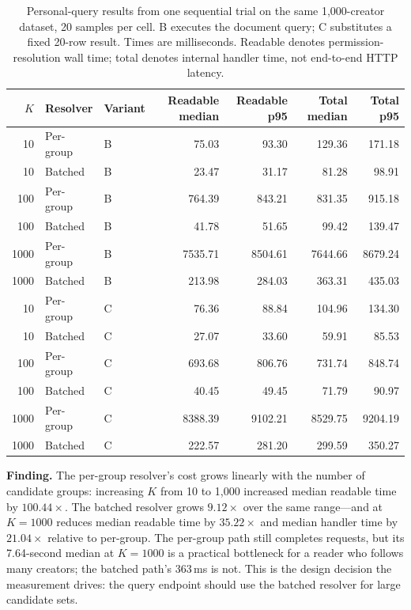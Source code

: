 \documentclass[sigconf, nonacm]{acmart}
\begin{document}
\begin{table}[t]
\centering
\small
\caption{Personal-query results from one sequential trial on the same
1,000-creator dataset, 20 samples per cell. B executes the document query; C
substitutes a fixed 20-row result. Times are milliseconds. Readable denotes
permission-resolution wall time; total denotes internal handler time, not
end-to-end HTTP latency.}
\label{tab:fanout}
\begin{tabular}{@{}rllrrrr@{}}
\toprule
$K$ & Resolver & Variant & Readable median & Readable p95 & Total median & Total p95 \\
\midrule
10 & Per-group & B & 75.03 & 93.30 & 129.36 & 171.18 \\
10 & Batched   & B & 23.47 & 31.17 & 81.28 & 98.91 \\
100 & Per-group & B & 764.39 & 843.21 & 831.35 & 915.18 \\
100 & Batched   & B & 41.78 & 51.65 & 99.42 & 139.47 \\
1000 & Per-group & B & 7535.71 & 8504.61 & 7644.66 & 8679.24 \\
1000 & Batched   & B & 213.98 & 284.03 & 363.31 & 435.03 \\
\midrule
10 & Per-group & C & 76.36 & 88.84 & 104.96 & 134.30 \\
10 & Batched   & C & 27.07 & 33.60 & 59.91 & 85.53 \\
100 & Per-group & C & 693.68 & 806.76 & 731.74 & 848.74 \\
100 & Batched   & C & 40.45 & 49.45 & 71.79 & 90.97 \\
1000 & Per-group & C & 8388.39 & 9102.21 & 8529.75 & 9204.19 \\
1000 & Batched   & C & 222.57 & 281.20 & 299.59 & 350.27 \\
\bottomrule
\end{tabular}
\end{table}

\textbf{Finding.} The per-group resolver's cost grows linearly with the number
of candidate groups: increasing $K$ from 10 to 1,000 increased median
readable time by $100.44\times$. The batched resolver grows $9.12\times$ over
the same range---and at $K=1000$ reduces median readable time by $35.22\times$
and median handler time by $21.04\times$ relative to per-group. The
per-group path still completes requests, but its 7.64-second median at
$K=1000$ is a practical bottleneck for a reader who follows many creators;
the batched path's 363\,ms is not. This is the design decision the
measurement drives: the query endpoint should use the batched resolver for
large candidate sets.
\end{document}

